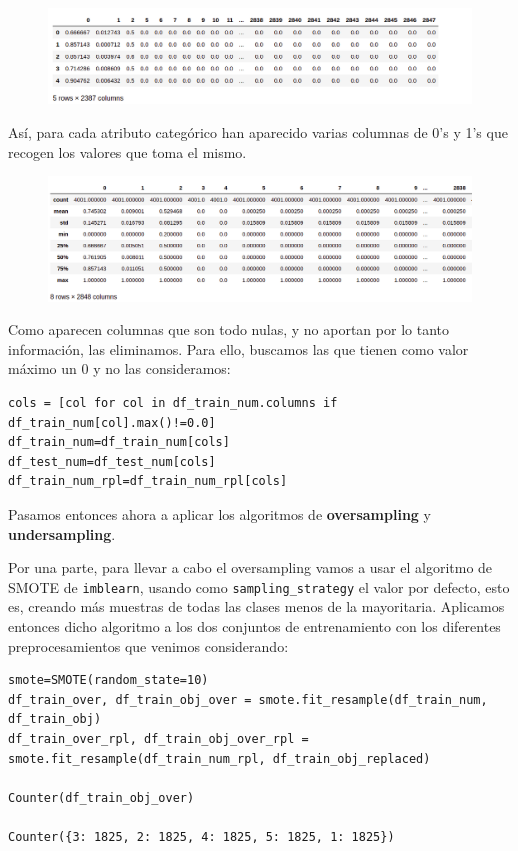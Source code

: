 \documentclass[a4paper,11pt]{article}
\begin{document}
\begin{figure}[H]
	\centering
	\includegraphics[width=1\linewidth]{img/onehot1}
	\caption{}
	\label{fig:onehot1}
\end{figure}


Así, para cada atributo categórico han aparecido varias columnas de 0's y 1's que recogen los valores que toma el mismo. 

\begin{figure}[H]
	\centering
	\includegraphics[width=1\linewidth]{img/onehot2}
	\caption{}
	\label{fig:onehot2}
\end{figure}

Como aparecen columnas que son todo nulas, y no aportan por lo tanto información, las eliminamos. Para ello, buscamos las que tienen como valor máximo un 0 y no las consideramos:
\begin{verbatim}
cols = [col for col in df_train_num.columns if df_train_num[col].max()!=0.0]
df_train_num=df_train_num[cols]
df_test_num=df_test_num[cols]
df_train_num_rpl=df_train_num_rpl[cols]
\end{verbatim}

Pasamos entonces ahora a aplicar los algoritmos de \textbf{oversampling} y \textbf{undersampling}.

Por una parte, para llevar a cabo el oversampling vamos a usar el algoritmo de SMOTE de \texttt{imblearn}, usando como \texttt{sampling_strategy} el valor por defecto, esto es, creando más muestras de todas las clases menos de la mayoritaria. Aplicamos entonces dicho algoritmo a los dos conjuntos de entrenamiento con los diferentes preprocesamientos que venimos considerando: 
\begin{verbatim}
smote=SMOTE(random_state=10)
df_train_over, df_train_obj_over = smote.fit_resample(df_train_num, df_train_obj)
df_train_over_rpl, df_train_obj_over_rpl = 
smote.fit_resample(df_train_num_rpl, df_train_obj_replaced)

Counter(df_train_obj_over)

Counter({3: 1825, 2: 1825, 4: 1825, 5: 1825, 1: 1825})
\end{verbatim}
\end{document}

